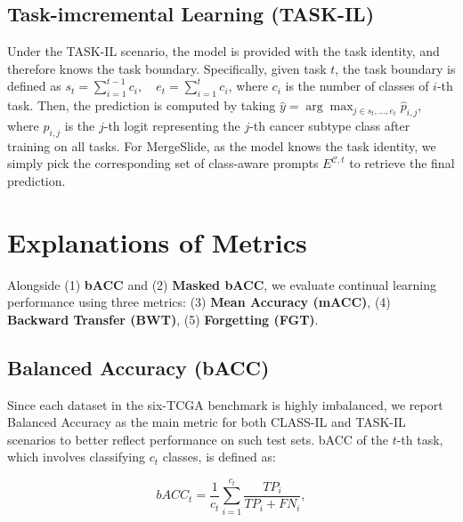 \documentclass[10pt,twocolumn,letterpaper]{article}
\begin{document}
\subsection{Task-imcremental Learning (TASK-IL)} Under the TASK-IL scenario, the model is provided with the task identity, and therefore knows the task boundary. Specifically, given task $t$, the task boundary is defined as
$s_t = \sum_{i=1}^{t-1} c_i,\quad e_t = \sum_{i=1}^{t} c_i$, where $c_i$ is the number of classes of $i$-th task. Then, the prediction is computed by taking
$\hat{y} = \arg\max_{j \in {s_t, \dots, e_t}} \hat{p}_{i,j}$, where $\hat{p}_{i,j}$ is the $j$-th logit representing the $j$-th cancer subtype class after training on all tasks. For MergeSlide, as the model knows the task identity, we simply pick the corresponding set of class-aware prompts $E^{\mathcal{C},t}$ to retrieve the final prediction.

\section{Explanations of Metrics}\label{sec:metrics}

Alongside (1) \textbf{bACC} and (2) \textbf{Masked bACC}, we evaluate continual learning performance using three metrics:
(3) \textbf{Mean Accuracy (mACC)},
(4) \textbf{Backward Transfer (BWT)},
(5) \textbf{Forgetting (FGT)}.

\medskip


\subsection{{Balanced Accuracy (bACC)}} {Since each dataset in the six-TCGA benchmark is highly imbalanced, we report Balanced Accuracy as the main metric for both CLASS-IL and TASK-IL scenarios to better reflect performance on such test sets. bACC of the $t$-th task, which involves classifying $c_t$ classes, is defined as:}

\begin{equation}
{bACC_{t} = \frac{1}{c_t}\sum_{i=1}^{c_t}\frac{TP_i}{TP_i+FN_i},}
\end{equation}

\end{document}
